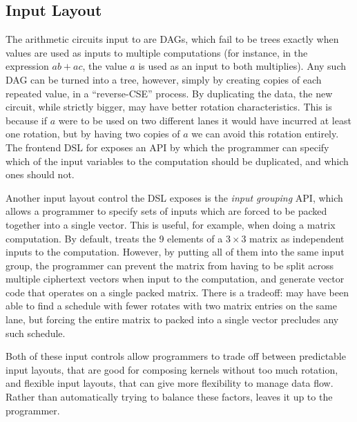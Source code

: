 \subsection{Input Layout}\label{sec:duplicating-inputs}
The arithmetic circuits input to \system are DAGs, which fail to be trees exactly when values are used as inputs to multiple computations (for instance, in the expression $ab + ac$, the value $a$ is used as an input to both multiplies).
Any such DAG can be turned into a tree, however, simply by creating copies of each repeated value, in a ``reverse-CSE'' process.
By duplicating the data, the new circuit, while strictly bigger, may have better rotation characteristics.
This is because if $a$ were to be used on two different lanes it would have incurred at least one rotation, but by having two copies of $a$ we can avoid this rotation entirely. The frontend DSL for \system exposes an API by which the programmer can specify which of the input variables to the computation should be duplicated, and which ones should not.

Another input layout control the \system DSL exposes is the {\em input grouping} API, which allows a programmer to specify sets of inputs which are forced to be packed together into a single vector.
This is useful, for example, when doing a matrix computation.
By default, \system treats the 9 elements of a $3 \times 3$ matrix as independent inputs to the computation.
However, by putting all of them into the same input group, the programmer can prevent the matrix from having to be split across multiple ciphertext vectors when input to the computation, and generate vector code that operates on a single packed matrix. 
There is a tradeoff: \system may have been able to find a schedule with fewer rotates with two matrix entries on the same lane, but forcing the entire matrix to packed into a single vector precludes any such schedule.

Both of these input controls allow programmers to trade off between predictable input layouts, that are good for composing kernels without too much rotation, and flexible input layouts, that can give \system more flexibility to manage data flow. Rather than automatically trying to balance these factors, \system leaves it up to the programmer.



